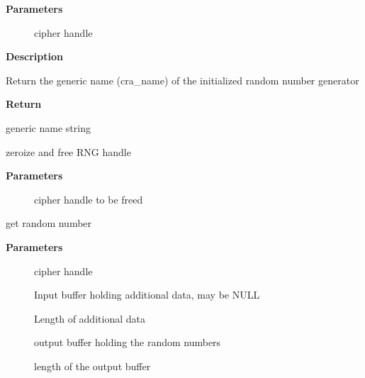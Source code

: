 \documentclass[a4paper,8pt,english]{sphinxmanual}
\begin{document}
\textbf{Parameters}
\begin{description}
\item[{}] \leavevmode
cipher handle

\end{description}

\textbf{Description}

Return the generic name (cra\_name) of the initialized random number generator

\textbf{Return}

generic name string

\begin{fulllineitems}
\label{crypto/api-rng:c.crypto_free_rng}
zeroize and free RNG handle

\end{fulllineitems}


\textbf{Parameters}
\begin{description}
\item[{}] \leavevmode
cipher handle to be freed

\end{description}

\begin{fulllineitems}
\label{crypto/api-rng:c.crypto_rng_generate}
get random number

\end{fulllineitems}


\textbf{Parameters}
\begin{description}
\item[{}] \leavevmode
cipher handle

\item[{}] \leavevmode
Input buffer holding additional data, may be NULL

\item[{}] \leavevmode
Length of additional data

\item[{}] \leavevmode
output buffer holding the random numbers

\item[{}] \leavevmode
length of the output buffer

\end{description}
\end{document}
